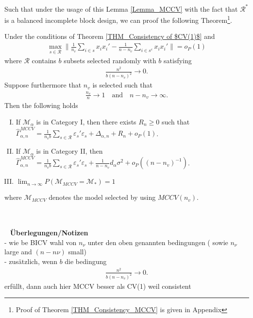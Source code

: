 \documentclass[Research_Module_ES.tex]{subfiles}
\begin{document}
Such that under the usage of this Lemma \ref{Lemma_MCCV} with the fact that $\mathcal{R}^\ast$ is a balanced incomplete block design, we can proof the following  Theorem\footnote{Proof of Theorem \ref{THM_Consistency_MCCV} is given in Appendix }. 


\begin{thm}
\label{THM_Consistency_MCCV}
Under the conditions of Theorem \ref{THM_Consistency of $CV(1)$} and
\begin{align*}
\max_{s\in \mathcal{R}}\biggl\lVert \frac{1}{n_v}\sum_{i\in s}x_ix_i' - \frac{1}{n-n_v}\sum_{i\in s^c}x_ix_i'\biggr\rVert =o_P(1)
\end{align*}
where $\mathcal{R}$ contains $b$ subsets selected randomly with $b$ satisfying
\begin{align*}
\frac{n^2}{b(n-n_v)^2}\to 0.
\end{align*}
Suppose furthermore that $n_v$ is selected such that
\begin{align*}
\frac{n_v}{n}\to 1 \quad \textrm{and} \quad n-n_v \to \infty.
\end{align*}
Then the following holds
\begin{enumerate}[(I)]
\item If $\mathcal{M}_\alpha$ is in Category I, then there exists $R_n \ge 0$ such that $\hat{\Gamma}_{\alpha,n}^{MCCV} = \frac{1}{n_vb}\sum_{s\in \mathcal{R}}\varepsilon_s'\varepsilon_s + \Delta_{\alpha,n} + R_n + o_P(1)$.
\item If $\mathcal{M}_\alpha$ is in Category II, then $\hat{\Gamma}_{\alpha,n}^{MCCV} = \frac{1}{n_vb}\sum_{s\in \mathcal{R}}\varepsilon_s'\varepsilon_s + \frac{1}{n-n_v}d_\alpha\sigma^2  + o_P((n-n_v)^{-1})$.
\item $\lim_{n\to\infty}P(\mathcal{M}_{MCCV}=\mathcal{M}_\ast) = 1$
\end{enumerate}
where $\mathcal{M}_{MCCV}$ denotes the model selected by using $MCCV(n_v)$.
\end{thm}

~\\\\~
\textbf{Überlegungen/Notizen}\\
- wie be BICV wahl von $n_\nu$ unter den oben genannten bedingungen ( sowie $n_\nu$ large and $(n-n\nu)$ small)\\
- zusätzlich, wenn $b$ die bedingung \begin{align*}
\frac{n^2}{b(n-n_v)^2}\to 0.
\end{align*}
erfüllt, dann auch hier MCCV besser als CV(1) weil consistent
\end{document}
